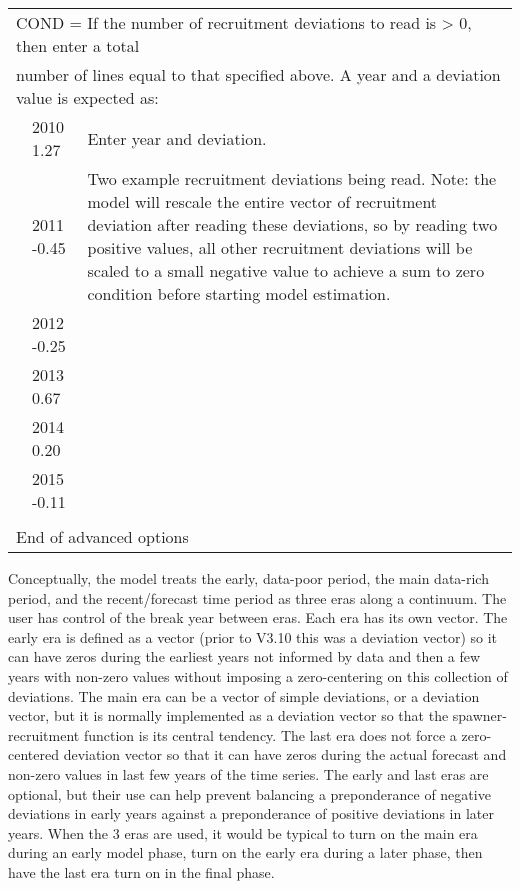 \begin{longtable}{p{1cm} p{3cm} p{12cm}}
	\multicolumn{3}{l}{COND = If the number of recruitment deviations to read is > 0, then enter a total} \Tstrut\\
	\multicolumn{3}{l}{number of lines equal to that specified above. A year and a deviation value is expected as:} \Bstrut\\
	& 2010 1.27 & Enter year and deviation. \\
	& 2011 -0.45 & \multirow{1}{1cm}[-0.25cm]{\parbox{10cm}{Two example recruitment deviations being read. Note: the model will rescale the entire vector of recruitment deviation after reading these deviations, so by reading two positive values, all other recruitment deviations will be scaled to a small negative value to achieve a sum to zero condition before starting model estimation.}} \\
	& 2012 -0.25 & \\
	& 2013 0.67 & \\
	& 2014 0.20 & \\
	& 2015 -0.11 & \\
	& & \\
	\hline
	
	\multicolumn{3}{l}{End of advanced options} \Tstrut\Bstrut\\
	\hline
\end{longtable}

Conceptually, the model treats the early, data-poor period, the main data-rich period, and the recent/forecast time period as three eras along a continuum. The user has control of the break year between eras. Each era has its own vector. The early era is defined as a vector (prior to V3.10 this was a deviation vector) so it can have zeros during the earliest years not informed by data and then a few years with non-zero values without imposing a zero-centering on this collection of deviations. The main era can be a vector of simple deviations, or a deviation vector, but it is normally implemented as a deviation vector so that the spawner-recruitment function is its central tendency. The last era does not force a zero-centered deviation vector so that it can have zeros during the actual forecast and non-zero values in last few years of the time series. The early and last eras are optional, but their use can help prevent balancing a preponderance of negative deviations in early years against a preponderance of positive deviations in later years. When the 3 eras are used, it would be typical to turn on the main era during an early model phase, turn on the early era during a later phase, then have the last era turn on in the final phase.

